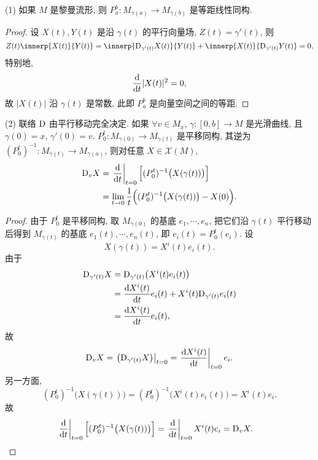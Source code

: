 \begin{remark}
  (1) 如果 $M$ 是黎曼流形, 则 $P_a^b: M_{\gamma(a)}\longrightarrow M_{\gamma(b)}$
  是等距线性同构.
  \begin{proof}
    设 $X(t), Y(t)$ 是沿 $\gamma(t)$ 的平行向量场, $Z(t)=\gamma'(t)$, 则
    \[Z(t)\innerp{X(t)}{Y(t)} = \innerp{\D_{\gamma'(t)}X(t)}{Y(t)}
    + \innerp{X(t)}{\D_{\gamma'(t)}Y(t)} = 0,\]
    特别地,
    \[\frac{\mathop{}\!\mathrm{d}}{\mathop{}\!\mathrm{d} t} |X(t)|^2 = 0,\]
    故 $|X(t)|$ 沿 $\gamma(t)$ 是常数, 此即 $P_a^b$ 是向量空间之间的等距.
  \end{proof}

  (2) 联络 $\mathrm{D}$ 由平行移动完全决定. 如果 $\forall v\in M_x$,
  $\gamma\colon [0,b]\to M$ 是光滑曲线, 且 $\gamma(0)=x$, $\gamma'(0)=v$.
  $P_0^t\colon M_{\gamma(0)}\to M_{\gamma(t)}$ 是平移同构,
  其逆为 $(P_0^t)^{-1}\colon M_{\gamma(t)}\to M_{\gamma(a)}$,
  则对任意 $X\in\mathscr{X}(M)$,
  \begin{align*}
    \mathrm{D}_v X
    & = \left.\frac{\mathop{}\!\mathrm{d}}{\mathop{}\!\mathrm{d} t}\right|_{t=0} \Bigl[(P_0^t)^{-1} \bigl(X(\gamma(t))\bigr)\Bigr] \\
    & = \lim_{t\to 0}\frac{1}{t} \Bigl((P_0^t)^{-1}\bigl(X(\gamma(t))\bigr) - X(0)\Bigr).
  \end{align*}
  \begin{proof}
    由于 $P_0^t$ 是平移同构, 取 $M_{\gamma(0)}$ 的基底 $e_1,\cdots,e_n$,
    把它们沿 $\gamma(t)$ 平行移动后得到 $M_{\gamma(t)}$ 的基底
    $e_1(t),\cdots,e_n(t)$, 即 $e_i(t)=P_0^t(e_i)$. 设
    \[X(\gamma(t)) = X^i(t)e_i(t).\]
    由于
    \begin{align*}
      \mathrm{D}_{\gamma'(t)} X
      & = \mathrm{D}_{\gamma'(t)} \bigl(X^i(t)e_i(t)\bigr) \\
      & = \frac{\mathop{}\!\mathrm{d} X^i(t)}{\mathop{}\!\mathrm{d} t}e_i(t) + X^i(t)\mathrm{D}_{\gamma'(t)}e_i(t) \\
      & = \frac{\mathop{}\!\mathrm{d} X^i(t)}{\mathop{}\!\mathrm{d} t}e_i(t),
    \end{align*}
    故
    \[\mathrm{D}_v X = \left.\bigl(\mathrm{D}_{\gamma'(t)} X\bigr)\right|_{t=0} =
    \left.\frac{\mathop{}\!\mathrm{d} X^i(t)}{\mathop{}\!\mathrm{d} t}\right|_{t=0} e_i.\]
    另一方面,
    \[(P_0^t)^{-1}\bigl(X(\gamma(t))\bigr) 
    = (P_0^t)^{-1} \bigl(X^i(t)e_i(t)\bigr) = X^i(t)e_i.\]
    故
    \begin{align*}
      \left.\frac{\mathop{}\!\mathrm{d}}{\mathop{}\!\mathrm{d} t}\right|_{t=0}\Bigl[(P_0^t)^{-1} \bigl(X(\gamma(t))\bigr)\Bigr]
      & = \left.\frac{\mathop{}\!\mathrm{d}}{\mathop{}\!\mathrm{d} t}\right|_{t=0} X^i(t)e_i = \mathrm{D}_v X.\qedhere
    \end{align*}
  \end{proof}
\end{remark}